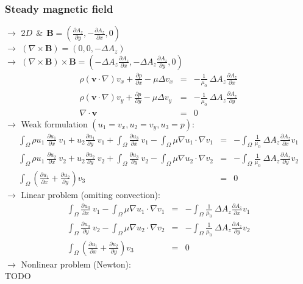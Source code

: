 \documentclass[smallextended]{svjour3}       %
\begin{document}
			\subsubsection{Steady magnetic field}
		$\rightarrow$ $2D\ \  \& \ \ \mathbf{B} = \left( \frac{\partial A_z}{\partial y}, -\frac{\partial A_z}{\partial x}, 0 \right)$\ \\
		$\rightarrow$ $\left(\nabla \times \mathbf{B} \right) = \left(0, 0, -\Delta A_z\right)$\ \\
		$\rightarrow$ $\left(\nabla \times \mathbf{B} \right) \times \mathbf{B} = \left(-\Delta A_z \frac{\partial A_z}{\partial x}, -\Delta A_z \frac{\partial A_z}{\partial y}, 0\right)$\ \\
		\begin{eqnarray}
			\rho \left(\mathbf{v} \cdot \nabla\right)v_x + \frac{\partial p}{\partial x} - \mu \Delta v_x & = & -\frac{1}{\mu_0} \ \Delta A_z \frac{\partial A_z}{\partial x}\\
			\rho \left(\mathbf{v} \cdot \nabla\right)v_y + \frac{\partial p}{\partial y}  - \mu \Delta v_y & = & -\frac{1}{\mu_0} \ \Delta A_z \frac{\partial A_z}{\partial y}\\
			\nabla \cdot \mathbf{v} & = & 0
		\end{eqnarray}
		$\rightarrow$ Weak formulation $(u_1 = v_x, u_2 = v_y, u_3 = p)$:\ \\
		\begin{eqnarray}
			\int_{\Omega} \rho u_1\ \frac{\partial u_1}{\partial x}\ v_1 + u_2 \frac{\partial u_1}{\partial y}\ v_1 + \int_{\Omega}\frac{\partial u_3}{\partial x}\ v_1 - \int_{\Omega}\mu \nabla u_1 \cdot \nabla v_1 & = & -\int_{\Omega}\frac{1}{\mu_0} \ \Delta A_z \frac{\partial A_z}{\partial x} v_1\\
			\int_{\Omega} \rho u_1\ \frac{\partial u_2}{\partial x}\ v_2 + u_2 \frac{\partial u_2}{\partial y}\ v_2 + \int_{\Omega}\frac{\partial u_3}{\partial y}\ v_2 - \int_{\Omega}\mu \nabla u_2 \cdot \nabla v_2 & = & -\int_{\Omega}\frac{1}{\mu_0} \ \Delta A_z \frac{\partial A_z}{\partial y} v_2\\
			\int_{\Omega}\left(\frac{\partial u_1}{\partial x} + \frac{\partial u_2}{\partial y}\right) v_3 & = & 0
		\end{eqnarray}
		$\rightarrow$ Linear problem (omiting convection):\ \\
		\begin{eqnarray}
			\int_{\Omega}\frac{\partial u_3}{\partial x}\ v_1 - \int_{\Omega}\mu \nabla u_1 \cdot \nabla v_1 & = & -\int_{\Omega}\frac{1}{\mu_0} \ \Delta A_z \frac{\partial A_z}{\partial x} v_1\\
			\int_{\Omega}\frac{\partial u_3}{\partial y}\ v_2 - \int_{\Omega}\mu \nabla u_2 \cdot \nabla v_2 & = & -\int_{\Omega}\frac{1}{\mu_0} \ \Delta A_z \frac{\partial A_z}{\partial y} v_2\\
			\int_{\Omega}\left(\frac{\partial u_1}{\partial x} + \frac{\partial u_2}{\partial y}\right) v_3 & = & 0
		\end{eqnarray}
		$\rightarrow$ Nonlinear problem (Newton):\ \\
		TODO
		
\end{document}
